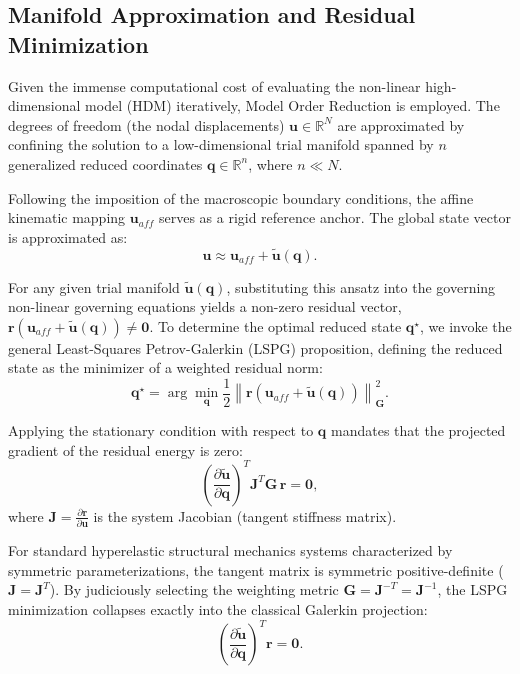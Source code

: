 \documentclass[12pt,a4paper]{article}
\begin{document}
\subsection{Manifold Approximation and Residual Minimization}

Given the immense computational cost of evaluating the non-linear high-dimensional model (HDM) iteratively, Model Order Reduction is employed. The degrees of freedom (the nodal displacements) $\mathbf{u} \in \mathbb{R}^N$ are approximated by confining the solution to a low-dimensional trial manifold spanned by $n$ generalized reduced coordinates $\mathbf{q} \in \mathbb{R}^n$, where $n \ll N$.

Following the imposition of the macroscopic boundary conditions, the affine kinematic mapping $\mathbf{u}_{aff}$ serves as a rigid reference anchor. The global state vector is approximated as:
\begin{equation}
    \mathbf{u} \approx \mathbf{u}_{aff} + \widetilde{\mathbf{u}}(\mathbf{q}).
\end{equation}

For any given trial manifold $\widetilde{\mathbf{u}}(\mathbf{q})$, substituting this ansatz into the governing non-linear governing equations yields a non-zero residual vector, $\mathbf{r}(\mathbf{u}_{aff} + \widetilde{\mathbf{u}}(\mathbf{q})) \neq \mathbf{0}$. To determine the optimal reduced state $\mathbf{q}^\star$, we invoke the general Least-Squares Petrov-Galerkin (LSPG) proposition, defining the reduced state as the minimizer of a weighted residual norm:
\begin{equation}
    \mathbf{q}^\star = \arg\min_{\mathbf{q}} \frac{1}{2} \left\| \mathbf{r}\left(\mathbf{u}_{aff} + \widetilde{\mathbf{u}}(\mathbf{q})\right) \right\|_{\mathbf{G}}^2.
\end{equation}

Applying the stationary condition with respect to $\mathbf{q}$ mandates that the projected gradient of the residual energy is zero:
\begin{equation}
    \left( \frac{\partial \widetilde{\mathbf{u}}}{\partial \mathbf{q}} \right)^T \mathbf{J}^T \mathbf{G}\, \mathbf{r} = \mathbf{0},
\end{equation}
where $\mathbf{J} = \frac{\partial \mathbf{r}}{\partial \mathbf{u}}$ is the system Jacobian (tangent stiffness matrix). 

For standard hyperelastic structural mechanics systems characterized by symmetric parameterizations, the tangent matrix is symmetric positive-definite ($\mathbf{J} = \mathbf{J}^T$). By judiciously selecting the weighting metric $\mathbf{G} = \mathbf{J}^{-T} = \mathbf{J}^{-1}$, the LSPG minimization collapses exactly into the classical Galerkin projection:
\begin{equation}
    \left( \frac{\partial \widetilde{\mathbf{u}}}{\partial \mathbf{q}} \right)^T \mathbf{r} = \mathbf{0}.
\end{equation}
\end{document}
